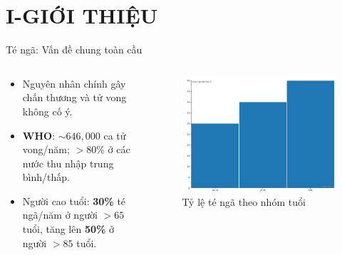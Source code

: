 
\section{I-GIỚI THIỆU}

\begin{frame}{Té ngã: Vấn đề chung toàn cầu}
    \begin{columns}[T]
        \begin{column}{0.48\textwidth}
            \begin{itemize}
                \item Nguyên nhân chính gây chấn thương và tử vong không cố ý.
                \item \textbf{WHO}: $\sim646,000$ ca tử vong/năm; $>80\%$ ở các nước thu nhập trung bình/thấp.
                \item Người cao tuổi: \textbf{30\%} té ngã/năm ở người $>65$ tuổi, tăng lên \textbf{50\%} ở người $>85$ tuổi.
            \end{itemize}
        \end{column}
        \begin{column}{0.48\textwidth}
            \begin{figure}
                \centering
                \includegraphics[width=\textwidth]{images/fall_status_who.png}
                \caption{Tỷ lệ té ngã theo nhóm tuổi}
            \end{figure}
        \end{column}
    \end{columns}
\end{frame}

